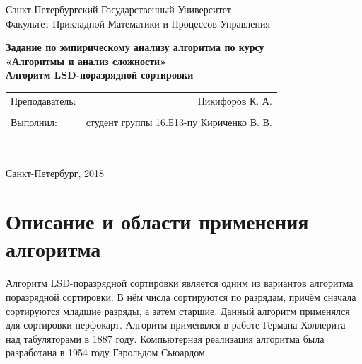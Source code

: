 \documentclass[a4paper]{article}
\begin{document}
\fontsize{14pt}{18pt}\selectfont
	

\begin{center}
	\hfill \break
	\large{Санкт-Петербургский Государственный Университет}\\ 
	\hfill \break
	\large{Факультет Прикладной Математики и Процессов Управления}\\
	\hfill \break
	\hfill \break
	\hfill \break
	\hfill \break
	\begin{huge}{\textbf{
		Задание по эмпирическому анализу алгоритма по курсу \\
		\hfill \break
		«Алгоритмы и анализ сложности»\\
		\hfill \break
		Алгоритм LSD-поразрядной сортировки\\
	}}\end{huge}
	\hfill \break
	\hfill \break
	\hfill \break
	\hfill \break
	\hfill \break
	\hfill \break
\end{center}

\hfill \break
\hfill \break

\begin{center}
	\large{
		\begin{tabular}{lr}
			Преподаватель: & Никифоров К. А. \\\\
			Выполнил:      & студент группы 16.Б13-пу Кириченко В. В. \\
		\end{tabular}
	}\\
\end{center}

\vspace*{\fill}

\begin{center} Санкт-Петербург, 2018 \end{center}
\thispagestyle{empty}

\newpage

\tableofcontents

\newpage

\section{Описание и области применения алгоритма}
Алгоритм LSD-поразрядной сортировки является одним из вариантов алгоритма поразрядной сортировки. В нём числа сортируются по разрядам, причём сначала сортируются младшие разряды, а затем старшие. Данный алгоритм применялся для сортировки перфокарт. Алгоритм применялся в работе Германа Холлерита над табуляторами в 1887 году. Компьютерная реализация алгоритма была разработана в 1954 году Гарольдом Сьюардом.
\end{document}
